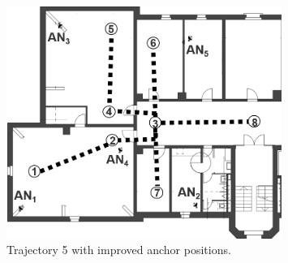 \begin{figure}[th]
\centering
\includegraphics[width=0.8\textwidth]{Figures/trajectory5_withAnchors}
\decoRule
\caption[Trajectory 5]{Trajectory 5 with improved anchor positions.}
\label{fig:trajectory5_withAnchors}
\end{figure}
